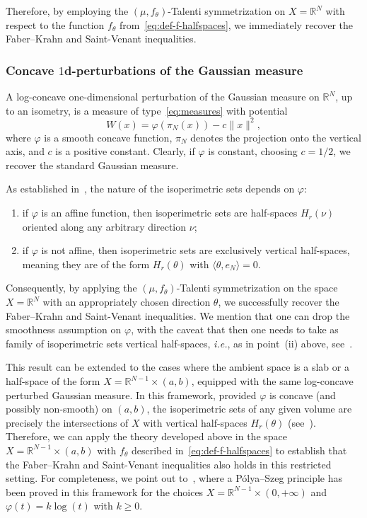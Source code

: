 \documentclass[a4paper,12pt,reqno]{amsart}
\numberwithin{equation}{section}
\newcommand{\R}{\mathbb{R}}
\newcommand{\Rn}{\mathbb{R}^N}
\renewcommand{\H}{\mathcal{H}}
\theoremstyle{plain}
\theoremstyle{definition}
\begin{document}
Therefore, by employing the $(\mu,f_\theta)$-Talenti symmetrization on $X=\Rn$ with respect to the function $f_\theta$ from~\eqref{eq:def-f-halfspaces}, we immediately recover the Faber--Krahn and Saint-Venant inequalities.

\subsubsection{Concave \texorpdfstring{$1$}{1}d-perturbations of the Gaussian measure}
\label{sec:gauss-perturbed}

A log-con\-cave one-dimensional perturbation of the Gaussian measure on $\Rn$, up to an isometry, is a measure of type~\eqref{eq:measures} with potential
%
\[
W(x)=\varphi(\pi_N(x))-c\|x\|^2,
\]
%
where $\varphi$ is a smooth concave function, $\pi_N$ denotes the projection onto the vertical axis, and $c$ is a positive constant. Clearly, if $\varphi$ is constant, choosing $c=1/2$, we recover the standard Gaussian measure.

As established in~\cite[Thm.~5.10]{Ros14}, the nature of the isoperimetric sets depends on $\varphi$:
%
\begin{enumerate}[label=(\roman*)]
    \item if $\varphi$ is an affine function, then isoperimetric sets are half-spaces $H_r(\nu)$ oriented along any arbitrary direction $\nu$;
    \item if $\varphi$ is not affine, then isoperimetric sets are exclusively vertical half-spaces, meaning they are of the form $H_r(\theta)$ with $\langle \theta,e_N\rangle=0$.
\end{enumerate}
%
Consequently, by applying the $(\mu,f_\theta)$-Talenti symmetrization on the space $X=\Rn$ with an appropriately chosen direction $\theta$, we successfully recover the Faber--Krahn and Saint-Venant inequalities. We mention that one can drop the smoothness assumption on $\varphi$, with the caveat that then one needs to take as family of isoperimetric sets vertical half-spaces, \emph{i.e.}, as in point~(ii) above, see~\cite[Thm.~5.13]{Ros14}.

This result can be extended to the cases where the ambient space is a slab or a half-space of the form $X=\R^{N-1}\times (a,b)$, equipped with the same log-concave perturbed Gaussian measure. In this framework, provided $\varphi$ is concave (and possibly non-smooth) on $(a,b)$, the isoperimetric sets of any given volume are precisely the intersections of $X$ with vertical half-spaces $H_r(\theta)$ (see~\cite[Thm.~5.12]{Ros14}). Therefore, we can apply the theory developed above in the space $X=\R^{N-1}\times(a,b)$ with $f_\theta$ described in~\eqref{eq:def-f-halfspaces} to establish that the Faber--Krahn and Saint-Venant inequalities also holds in this restricted setting. For completeness, we point out to~\cite[Thm.~3.1]{BCM08}, where a P\'olya--Szeg\H{o} principle has been proved in this framework for the choices $X=\mathbb{R}^{N-1}\times (0,+\infty)$ and $\varphi(t)=k \log(t)$ with $k\ge 0$.
\end{document}

